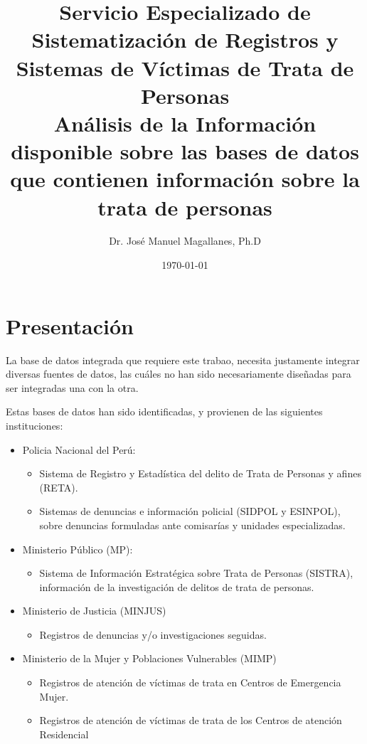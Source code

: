 \documentclass{article}
\title{Servicio Especializado de Sistematización de Registros y Sistemas de Víctimas de Trata de Personas\\
\vspace{50px}
{\bf Análisis de la Información disponible sobre las bases de datos que contienen información sobre la trata de personas}}
\author{\vspace{75px}Dr. José Manuel Magallanes, Ph.D}
\date{\today}
\begin{document}

\maketitle
\thispagestyle{empty}

\clearpage
\setcounter{page}{1}
\section{Presentación}

La base de datos integrada que requiere este trabao, necesita justamente integrar diversas fuentes de datos, las cuáles no han sido necesariamente diseñadas para ser integradas una con la otra.

Estas bases de datos han sido identificadas, y provienen de las siguientes instituciones:
\begin{itemize}


\item Policia Nacional del Perú:
\begin{itemize}
\item Sistema de Registro y Estad\'{i}stica del delito de Trata de Personas y afines (RETA).
\item Sistemas de denuncias e informaci\'{o}n policial (SIDPOL y ESINPOL), sobre denuncias formuladas ante comisar\'{i}as y unidades especializadas.
\end{itemize}

\item Ministerio Público (MP):
\begin{itemize}
\item Sistema de Informaci\'{o}n Estrat\'{e}gica sobre Trata de Personas (SISTRA), informaci\'{o}n de la investigaci\'{o}n de delitos de trata de personas.

\end{itemize}


\item Ministerio de Justicia (MINJUS)
\begin{itemize}
\item Registros  de denuncias y/o investigaciones seguidas.
\end{itemize}

\item Ministerio de la Mujer y Poblaciones Vulnerables (MIMP)
\begin{itemize}
\item Registros de atención de víctimas de trata en Centros de Emergencia Mujer.

\item Registros de atención de víctimas de trata de los Centros de atención Residencial 
\end{itemize}
\end{itemize}
\end{document}
